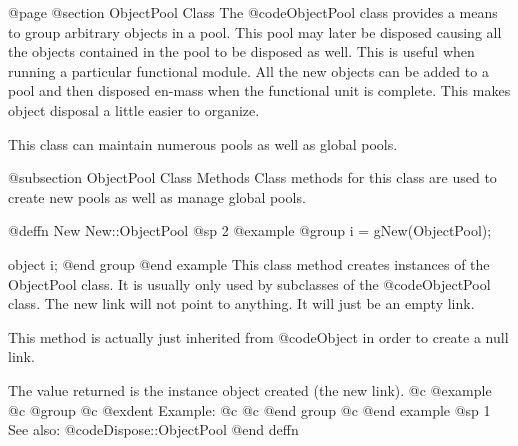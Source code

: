
@page
@section ObjectPool Class
The @code{ObjectPool} class provides a means to group arbitrary objects in a pool.
This pool may later be disposed causing all the objects contained in the pool to
be disposed as well.  This is useful when running a particular functional module.
All the new objects can be added to a pool and then disposed en-mass when the functional
unit is complete.  This makes object disposal a little easier to organize.

This class can maintain numerous pools as well as global pools.

@subsection ObjectPool Class Methods
Class methods for this class are used to create new pools as well as manage global pools.





@deffn {New} New::ObjectPool
@sp 2
@example
@group
i = gNew(ObjectPool);

object  i;
@end group
@end example
This class method creates instances of the ObjectPool class.  It is usually
only used by subclasses of the @code{ObjectPool} class.  The new link
will not point to anything.  It will just be an empty link.

This method is actually just inherited from @code{Object} in order
to create a null link.

The value returned is the instance object created (the new link).
@c @example
@c @group
@c @exdent Example:
@c 
@c @end group
@c @end example
@sp 1
See also:  @code{Dispose::ObjectPool}
@end deffn

